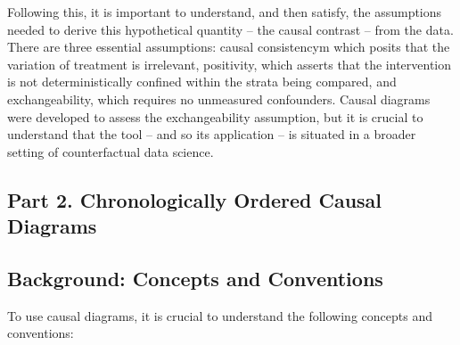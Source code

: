 \documentclass[
  singlecolumn]{report}
\begin{document}
Following this, it is important to understand, and then satisfy, the
assumptions needed to derive this hypothetical quantity -- the causal
contrast -- from the data. There are three essential assumptions: causal
consistencym which posits that the variation of treatment is irrelevant,
positivity, which asserts that the intervention is not deterministically
confined within the strata being compared, and exchangeability, which
requires no unmeasured confounders. Causal diagrams were developed to
assess the exchangeability assumption, but it is crucial to understand
that the tool -- and so its application -- is situated in a broader
setting of counterfactual data science.

\hypertarget{part-2.-chronologically-ordered-causal-diagrams}{%
\subsection{Part 2. Chronologically Ordered Causal
Diagrams}\label{part-2.-chronologically-ordered-causal-diagrams}}

\hypertarget{background-concepts-and-conventions}{%
\subsection{Background: Concepts and
Conventions}\label{background-concepts-and-conventions}}

To use causal diagrams, it is crucial to understand the following
concepts and conventions:
\end{document}
